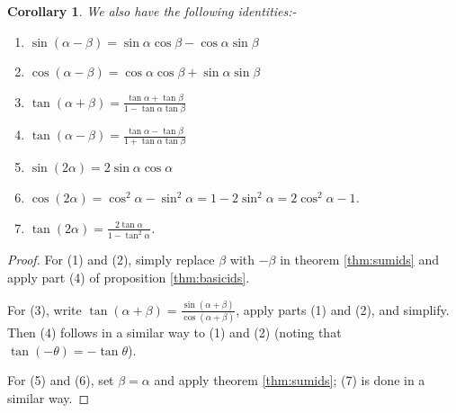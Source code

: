 \documentclass[a4paper,leqno]{article}
\newcommand{\marginsymbol}{\marginpar{\hfill(\ding{43})}}
\numberwithin{equation}{section}
\newtheorem{cor}[equation]{Corollary}
\theoremstyle{definition}
\newtheorem{exercise}[equation]{Exercise}
\theoremstyle{remark}
\begin{document}

\begin{cor}
  We also have the following identities:-\marginsymbol
  \begin{enumerate}
    \item $ \sin(\alpha - \beta) = \sin \alpha \cos \beta - \cos \alpha \sin \beta $
    \item $ \cos(\alpha - \beta) = \cos \alpha \cos \beta + \sin \alpha \sin \beta $
    \item $ \tan(\alpha + \beta) = \frac{\tan \alpha + \tan \beta}{1 - \tan \alpha \tan \beta} $
    \item $ \tan(\alpha - \beta) = \frac{\tan \alpha - \tan \beta}{1 + \tan \alpha \tan \beta} $
    \item $ \sin(2\alpha) = 2 \sin \alpha \cos \alpha $
    \item $ \cos(2\alpha) = \cos^2 \alpha - \sin^2 \alpha = 1 - 2\sin^2 \alpha = 2\cos^2 \alpha - 1 $.
    \item $ \tan(2\alpha) = \frac{2\tan \alpha}{1 - \tan^2 \alpha} $.
  \end{enumerate}
\end{cor}
\begin{proof}
  For (1) and (2), simply replace $ \beta $ with $ -\beta $ in theorem \ref{thm:sumids} and apply part (4) of proposition \ref{thm:basicids}.

  For (3), write $ \tan(\alpha + \beta) = \frac{\sin(\alpha + \beta)}{\cos(\alpha + \beta)} $, apply parts (1) and (2), and simplify. Then (4)
  follows in a similar way to (1) and (2) (noting that $ \tan (-\theta) = -\tan \theta $).

  For (5) and (6), set $ \beta = \alpha $ and apply theorem \ref{thm:sumids}; (7) is done in a similar way.
\end{proof}
\end{document}
